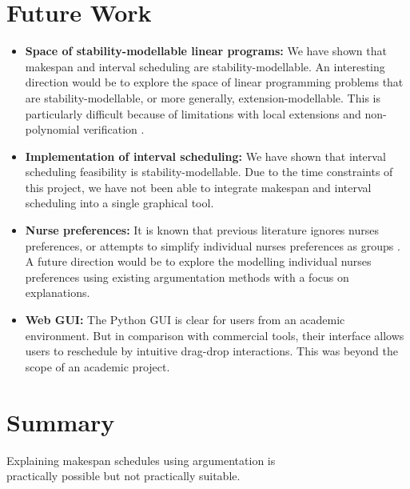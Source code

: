 \section{Future Work}

\begin{itemize}
	\item\textbf{Space of stability-modellable linear programs:} We have shown that makespan and interval scheduling are stability-modellable. An interesting direction would be to explore the space of linear programming problems that are stability-modellable, or more generally, extension-modellable. This is particularly difficult because of limitations with local extensions and non-polynomial verification \cite{aes}.
	\item\textbf{Implementation of interval scheduling:} We have shown that interval scheduling feasibility is stability-modellable. Due to the time constraints of this project, we have not been able to integrate makespan and interval scheduling into a single graphical tool.
	\item\textbf{Nurse preferences:} It is known that previous literature ignores nurses preferences, or attempts to simplify individual nurses preferences as groups \cite{preferences}. A future direction would be to explore the modelling individual nurses preferences using existing argumentation methods \cite{acceptability, aba} with a focus on explanations.
	\item\textbf{Web GUI:} The Python GUI is clear for users from an academic environment. But in comparison with commercial tools, their interface allows users to reschedule by intuitive drag-drop interactions. This was beyond the scope of an academic project.
\end{itemize}

\section{Summary}

\begin{framed}
	\centering
	Explaining makespan schedules using argumentation is\\practically
	possible but not practically suitable.
\end{framed}